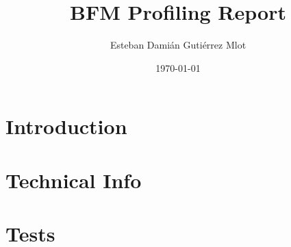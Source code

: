 \documentclass[]{report}   %
\begin{document}
\title{BFM Profiling Report}   %
\author{Esteban Dami\'an Guti\'errez Mlot}         %
\date{\today}    %
\maketitle

\tableofcontents

\chapter{Introduction}


\chapter{Technical Info}


\chapter{Tests}\label{chap:tests}



 
\end{document}
